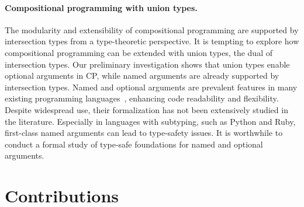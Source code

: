 \paragraph{Compositional programming with union types.}
The modularity and extensibility of compositional programming are supported by
intersection types from a type-theoretic perspective. It is tempting to explore
how compositional programming can be extended with union types, the dual of
intersection types. Our preliminary investigation shows that union types enable
optional arguments in CP, while named arguments are already supported by
intersection types. Named and optional arguments are prevalent features in many
existing programming
languages~\citep{garrigue2001labeled,flatt2009keyword,rytz2010named}, enhancing
code readability and flexibility. Despite widespread use, their formalization
has not been extensively studied in the literature. Especially in languages with
subtyping, such as Python and Ruby, first-class named arguments can lead to
type-safety issues. It is worthwhile to conduct a formal study of type-safe
foundations for named and optional arguments.

\section{Contributions}

